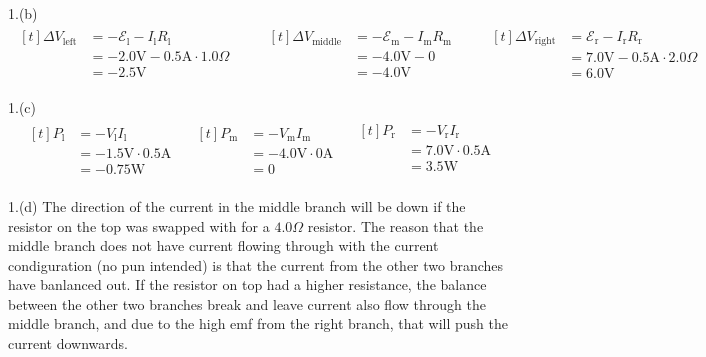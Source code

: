 \documentclass[11pt]{article}
\begin{document}
1.(b)
\begin{align*}
\begin{aligned}[t]
\Delta V_{\mathrm{left}} &= - \mathcal{E}_\mathrm{l} - I_\mathrm{l}R_\mathrm{l} \\
  &= - 2.0 \mathrm{V} - 0.5 \mathrm{A} \cdot 1.0 \Omega \\
  &= - 2.5 \mathrm{V}
\end{aligned}
\qquad
\begin{aligned}[t]
\Delta V_{\mathrm{middle}} &= - \mathcal{E}_\mathrm{m} - I_\mathrm{m}R_\mathrm{m} \\
  &= - 4.0 \mathrm{V} - 0 \\
  &= - 4.0 \mathrm{V}
\end{aligned}
\qquad
\begin{aligned}[t]
\Delta V_{\mathrm{right}} &= \mathcal{E}_\mathrm{r} - I_\mathrm{r}R_\mathrm{r} \\
  &= 7.0 \mathrm{V} - 0.5 \mathrm{A} \cdot 2.0 \Omega \\
  &= 6.0 \mathrm{V}
\end{aligned}
\end{align*}

1.(c)
\begin{align*}
\begin{aligned}[t]
P_{\mathrm{l}} &= - V_{\mathrm{l}} I_{\mathrm{l}} \\
  &= - 1.5 \mathrm{V} \cdot 0.5 \mathrm{A} \\
  &= - 0.75 \mathrm{W}
\end{aligned}
\quad
\begin{aligned}[t]
P_{\mathrm{m}} &= - V_{\mathrm{m}} I_{\mathrm{m}} \\
  &= - 4.0 \mathrm{V} \cdot 0 \mathrm{A} \\
  &= 0
\end{aligned}
\quad
\begin{aligned}[t]
P_{\mathrm{r}} &= - V_{\mathrm{r}} I_{\mathrm{r}} \\
  &=  7.0 \mathrm{V} \cdot 0.5 \mathrm{A} \\
  &=  3.5 \mathrm{W} \\
\end{aligned}
\end{align*}



1.(d)
The direction of the current in the middle branch will be down if the resistor on the top was swapped with for a \(4.0 \Omega\) resistor. The reason that the middle branch does not have current flowing through with the current condiguration (no pun intended) is that the current from the other two branches have banlanced out. If the resistor on top had a higher resistance, the balance between the other two branches break and leave current also flow through the middle branch, and due to the high emf from the right branch, that will push the current downwards.
\end{document}
